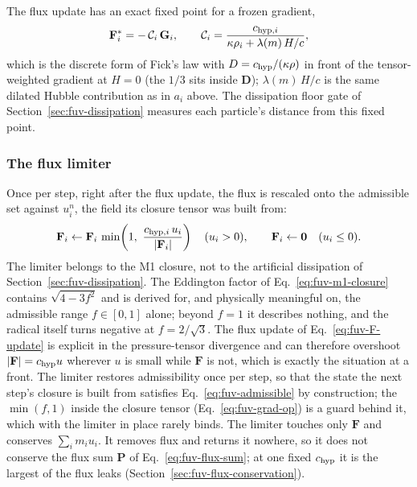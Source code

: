 The flux update has an exact fixed point for a frozen gradient,
\begin{equation}
  \mathbf F_i^\ast = -\,\mathcal C_i\,\mathbf G_i , \qquad
  \mathcal C_i = \frac{c_{{\rm hyp},i}}{\kappa\rho_i + \lambda(m)\,H/c} ,
  \label{eq:fuv-fixed-point}
\end{equation}
which is the discrete form of Fick's law with $D = c_{\rm hyp}/(\kappa\rho)$
in front of the tensor-weighted gradient at $H=0$ (the $1/3$ sits inside
$\mathbf D$); $\lambda(m)\,H/c$ is the same dilated Hubble contribution as in $a_i$
above. The dissipation floor gate of
Section~\ref{sec:fuv-dissipation} measures each particle's distance
from this fixed point.

\subsubsection{The flux limiter}
\label{sec:fuv-limiter}

Once per step, right after the flux update, the flux is rescaled onto
the admissible set against $u_i^n$, the field its closure tensor was
built from:
\begin{equation}
  \mathbf F_i \leftarrow \mathbf F_i\,
    \min\!\left(1,\ \frac{c_{{\rm hyp},i}\,u_i}{|\mathbf F_i|}\right)
    \quad (u_i>0) , \qquad
  \mathbf F_i \leftarrow \mathbf 0 \quad (u_i\le0) .
  \label{eq:fuv-flux-limiter}
\end{equation}
The limiter belongs to the M1 closure, not to the artificial dissipation
of Section~\ref{sec:fuv-dissipation}. The Eddington factor of
Eq.~\ref{eq:fuv-m1-closure} contains $\sqrt{4-3f^2}$ and is derived for,
and physically meaningful on, the admissible range $f\in[0,1]$ alone;
beyond $f = 1$ it describes nothing, and the radical itself turns negative
at $f = 2/\sqrt3$. The flux update of Eq.~\ref{eq:fuv-F-update} is
explicit in the pressure-tensor divergence and can therefore overshoot
$|\mathbf F| = c_{\rm hyp}u$ wherever $u$ is small while $\mathbf F$ is
not, which is exactly the situation at a front. The limiter restores
admissibility once per step, so that the state the next step's closure is
built from satisfies Eq.~\ref{eq:fuv-admissible} by construction; the
$\min(f,1)$ inside the closure tensor (Eq.~\ref{eq:fuv-grad-op}) is a
guard behind it, which with the limiter in place rarely binds. The limiter
touches only $\mathbf F$ and conserves $\sum_i m_i u_i$. It removes flux
and returns it nowhere, so it does not conserve the flux sum
$\mathbf P$ of Eq.~\ref{eq:fuv-flux-sum}; at one fixed $c_{\rm hyp}$ it
is the largest of the flux leaks
(Section~\ref{sec:fuv-flux-conservation}).

